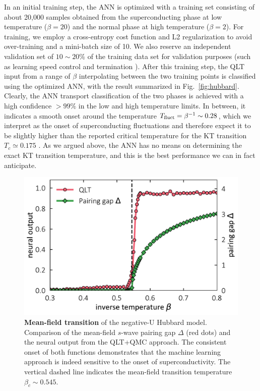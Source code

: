\documentclass[amsmath,amssymb, aps, prx, longbibliography, twocolumn]{revtex4-1}
\begin{document}
In an initial training step, the ANN is optimized with a training set consisting of about 20,000 samples obtained from the superconducting phase at low temperature ($\beta=20$) and the normal phase at high temperature ($\beta=2$). 
For training, we employ a cross-entropy cost function and L2 regularization to avoid over-training and a mini-batch size of 10. We also reserve an independent validation set of $10\sim 20\%$ of the training data set for validation purposes (such as learning speed control and termination \cite{MLbook}).
After this training step, the QLT input from a range of $\beta$ interpolating between the two training points is classified using the optimized ANN, with the result summarized in Fig.~\ref{fig:hubbard}. 
Clearly, the ANN transport classification of the two phases is achieved with a high confidence  $>99\%$ in the low and high temperature limits. In between, it indicates a smooth onset around the temperature $T_{\rm fluct}=\beta^{-1} \sim 0.28$, which we interpret as the onset of superconducting fluctuations and therefore expect it to be slightly higher than the reported critical temperature for the KT transition $T_c\simeq 0.175$ \cite{Scalettar1989, Denteneer1993}. As we argued above, the ANN has no means on determining the exact KT transition temperature, and this is the best performance we can in fact anticipate. 

\begin{figure}
\includegraphics[scale=.43]{fig2.pdf}
\caption{{\bf Mean-field transition} of the negative-U Hubbard model. 
		Comparison of the mean-field $s$-wave pairing gap $\Delta$ (red dots) 
		and the neural output from the QLT+QMC approach.
		The consistent onset of both functions demonstrates that the machine learning approach is indeed sensitive 
		to the onset of superconductivity. 
		The vertical dashed line indicates the mean-field transition temperature $\beta_c\sim 0.545$.}
		\label{fig:mlmft}
\end{figure}
\end{document}
